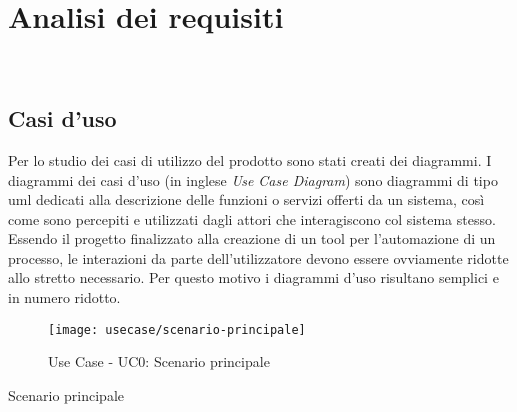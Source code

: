 
\chapter{Analisi dei requisiti}
\label{cap:analisi-requisiti}

\\

\section{Casi d'uso}

Per lo studio dei casi di utilizzo del prodotto sono stati creati dei diagrammi.
I diagrammi dei casi d'uso (in inglese \emph{Use Case Diagram}) sono diagrammi di tipo \gls{uml} dedicati alla descrizione delle funzioni o servizi offerti da un sistema, così come sono percepiti e utilizzati dagli attori che interagiscono col sistema stesso.
Essendo il progetto finalizzato alla creazione di un tool per l'automazione di un processo, le interazioni da parte dell'utilizzatore devono essere ovviamente ridotte allo stretto necessario. Per questo motivo i diagrammi d'uso risultano semplici e in numero ridotto.




\begin{figure}[!h] 
    \centering 
    \texttt{[image: usecase/scenario-principale]} 
    \caption{Use Case - UC0: Scenario principale}
\end{figure}

\begin{usecase}{0}{Scenario principale}
\label{uc:scenario-principale}
\end{usecase}

